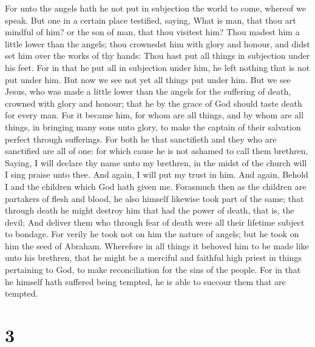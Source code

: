  For unto the angels hath he not put in subjection the world
to come, whereof we speak.  But one in a certain place
testified, saying, What is man, that thou art mindful of him? or the son
of man, that thou visitest him?  Thou madest him a little
lower than the angels; thou crownedst him with glory and honour, and
didst set him over the works of thy hands:  Thou hast put
all things in subjection under his feet. For in that he put all in
subjection under him, he left nothing that is not put under him. But now
we see not yet all things put under him.  But we see Jesus,
who was made a little lower than the angels for the suffering of death,
crowned with glory and honour; that he by the grace of God should taste
death for every man.  For it became him, for whom are all
things, and by whom are all things, in bringing many sons unto glory, to
make the captain of their salvation perfect through sufferings.
 For both he that sanctifieth and they who are sanctified
are all of one: for which cause he is not ashamed to call them brethren,
 Saying, I will declare thy name unto my brethren, in the
midst of the church will I sing praise unto thee.  And
again, I will put my trust in him. And again, Behold I and the children
which God hath given me.  Forasmuch then as the children
are partakers of flesh and blood, he also himself likewise took part of
the same; that through death he might destroy him that had the power of
death, that is, the devil;  And deliver them who through
fear of death were all their lifetime subject to bondage. 
For verily he took not on him the nature of angels; but he took on him
the seed of Abraham.  Wherefore in all things it behoved
him to be made like unto his brethren, that he might be a merciful and
faithful high priest in things pertaining to God, to make reconciliation
for the sins of the people.  For in that he himself hath
suffered being tempted, he is able to succour them that are tempted.

\hypertarget{section-2}{%
\section{3}\label{section-2}}

